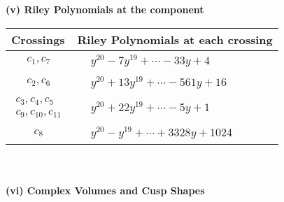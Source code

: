 \documentclass[1p]{elsarticle_modified}
\theoremstyle{definition}
\begin{document}
\newpage\renewcommand{\arraystretch}{1}
\flushleft \textbf{(v) Riley Polynomials at the component}\newline \\
\begin{tabular}{m{50pt}|m{274pt}}
Crossings & \hspace{64pt}Riley Polynomials at each crossing \\
\hline $$\begin{aligned}c_{1},c_{7}\end{aligned}$$&$\begin{aligned}
&y^{20}-7 y^{19}+\cdots-33 y+4
\end{aligned}$\\
\hline $$\begin{aligned}c_{2},c_{6}\end{aligned}$$&$\begin{aligned}
&y^{20}+13 y^{19}+\cdots-561 y+16
\end{aligned}$\\
\hline $$\begin{aligned}c_{3},c_{4},c_{5}\\c_{9},c_{10},c_{11}\end{aligned}$$&$\begin{aligned}
&y^{20}+22 y^{19}+\cdots-5 y+1
\end{aligned}$\\
\hline $$\begin{aligned}c_{8}\end{aligned}$$&$\begin{aligned}
&y^{20}- y^{19}+\cdots+3328 y+1024
\end{aligned}$\\
\hline
\end{tabular}\\~\\
\newpage\flushleft \textbf{(vi) Complex Volumes and Cusp Shapes}
\end{document}
